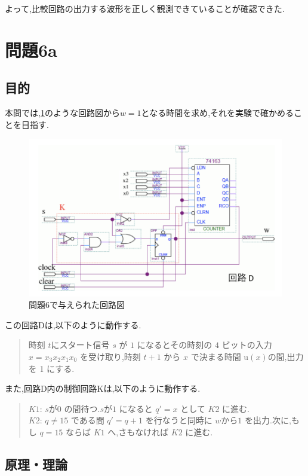 \documentclass[autodetect-engine, dvi=dvipdfmx, 10pt, a4paper, ja=standard]{bxjsarticle}
\begin{document}
よって,比較回路の出力する波形を正しく観測できていることが確認できた.

\section{問題6a}
\label{sec:ex6a}

\subsection{目的}
本問では,\ref{fig:ex6}のような回路図から$w = 1$となる時間を求め,それを実験で確かめることを目指す.

\begin{figure}[htbp]
	\centering
	\includegraphics[width=\columnwidth]{asset/ex6_got.png}
	\caption{問題6で与えられた回路図}
	\label{fig:ex6}
\end{figure}

この回路Dは,以下のように動作する.
\begin{quote}
	時刻 $t $にスタート信号 $s$ が $1$ になるとその時刻の $4$ ビットの入力 $x = x_3 x_2 x_1 x_0$ を受け取り,時刻 $t+1$ から $x$ で決まる時間 u$(x) $の間,出力を 1 にする.
\end{quote}

また,回路D内の制御回路Kは,以下のように動作する.

\begin{quote}
	$K1$: $s が 0$ の間待つ.$s が 1$ になると $q' = x$  として $K2$ に進む.	 \\
	$K2$: $q \neq 15$ である間 $q' = q + 1$ を行なうと同時に $w から 1$ を出力.次に,もし $q = 15$ ならば $K1$ へ,さもなければ $K2$ に進む.
\end{quote}


\subsection{原理・理論}
\end{document}
